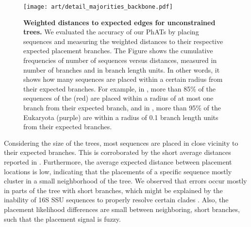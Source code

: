 \begin{figure}[hpbt]
    \centering
    \texttt{[image: art/detail\_majorities\_backbone.pdf]}
    \begin{subfigure}{0pt}
        \label{fig:detail_majorities_backbone:sub:num_br}
    \end{subfigure}
    \begin{subfigure}{0pt}
        \label{fig:detail_majorities_backbone:sub:br_dist}
    \end{subfigure}
    \caption[Weighted distances to expected edges for unconstrained trees]{
        \textbf{Weighted distances to expected edges for unconstrained trees.}
        We evaluated the accuracy of our \acp{PhAT} by placing sequences
        and measuring the weighted distances to their respective expected placement branches.
        The Figure shows the cumulative frequencies of number of sequences versus distances,
        measured  in number of branches
        and  in branch length units.
        In other words, it shows how many sequences are placed
        within a certain radius from their expected branches.
        For example, in ,
        more than 85\% of the sequences of the  (red) are placed
        within a radius of at most one branch from their expected branch,
        and in , more than 95\% of the Eukaryota (purple) are
        within a radius of 0.1 branch length units from their expected branches.
    }
    \label{fig:detail_majorities_backbone}
\end{figure}


Considering the size of the trees, most sequences are placed in close vicinity to their expected branches.
This is corroborated by the short average distances reported in .
Furthermore, the average expected distance between placement locations \citep[EDPL,][]{Matsen2010} is low,
indicating that the placements of a specific sequence mostly cluster in a small neighborhood of the tree.
We observed that errors occur mostly in parts of the tree with short branches,
which might be explained by the inability of 16S SSU sequences to properly resolve certain clades \citep{Janda2007}.
Also, the placement likelihood differences are small between neighboring, short branches,
such that the placement signal is fuzzy.


